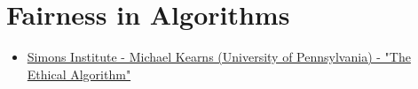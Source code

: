 \chapter{Fairness in Algorithms}
\begin{resource}
\begin{itemize}
\item \href{https://www.youtube.com/watch?v=jtZdytJA0m8&ab_channel=SimonsInstitute}{Simons Institute - Michael Kearns (University of Pennsylvania) - "The Ethical Algorithm"}
\end{itemize}
\end{resource}



%
%
